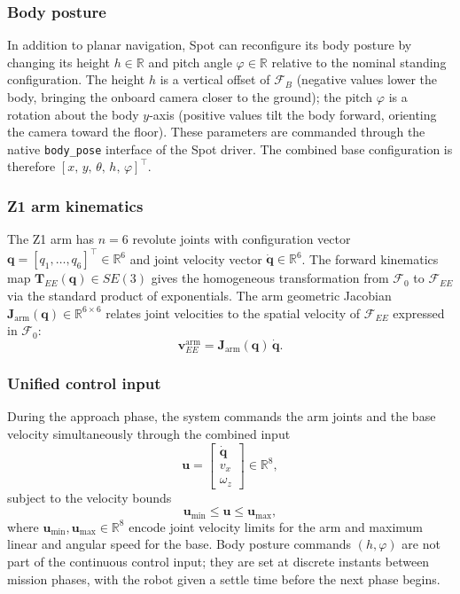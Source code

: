 \subsubsection{Body posture}
In addition to planar navigation, Spot can reconfigure its body posture by
changing its height $h \in \mathbb{R}$ and pitch angle
$\varphi \in \mathbb{R}$ relative to the nominal standing configuration.
The height $h$ is a vertical offset of $\mathcal{F}_B$ (negative values lower
the body, bringing the onboard camera closer to the ground); the pitch
$\varphi$ is a rotation about the body $y$-axis (positive values tilt the
body forward, orienting the camera toward the floor). These parameters are
commanded through the native \texttt{body\_pose} interface of the Spot
driver. The combined base configuration is therefore
$[x,\, y,\, \theta,\, h,\, \varphi]^\top$.

\subsubsection{Z1 arm kinematics}
The Z1 arm has $n = 6$ revolute joints with configuration vector
$\mathbf{q} = [q_1, \ldots, q_6]^\top \in \mathbb{R}^6$ and joint velocity
vector $\dot{\mathbf{q}} \in \mathbb{R}^6$. The forward kinematics map
$\mathbf{T}_{EE}(\mathbf{q}) \in SE(3)$ gives the homogeneous transformation
from $\mathcal{F}_0$ to $\mathcal{F}_{EE}$ via the standard product of
exponentials. The arm geometric Jacobian
$\mathbf{J}_{\mathrm{arm}}(\mathbf{q}) \in \mathbb{R}^{6 \times 6}$ relates
joint velocities to the spatial velocity of $\mathcal{F}_{EE}$ expressed in
$\mathcal{F}_0$:
\begin{equation}
  \mathbf{v}_{EE}^{\mathrm{arm}} =
  \mathbf{J}_{\mathrm{arm}}(\mathbf{q})\,\dot{\mathbf{q}}.
  \label{eq:arm_jacobian}
\end{equation}

\subsubsection{Unified control input}
During the approach phase, the system commands the arm joints and the base
velocity simultaneously through the combined input
\begin{equation}
  \mathbf{u} =
  \begin{bmatrix} \dot{\mathbf{q}} \\ v_x \\ \omega_z \end{bmatrix}
  \in \mathbb{R}^8,
  \label{eq:decision_var}
\end{equation}
subject to the velocity bounds
\begin{equation}
  \mathbf{u}_{\min} \leq \mathbf{u} \leq \mathbf{u}_{\max},
  \label{eq:bounds}
\end{equation}
where $\mathbf{u}_{\min}, \mathbf{u}_{\max} \in \mathbb{R}^8$ encode joint
velocity limits for the arm and maximum linear and angular speed for the
base. Body posture commands $(h, \varphi)$ are not part of the continuous
control input; they are set at discrete instants between mission phases,
with the robot given a settle time before the next phase begins.

